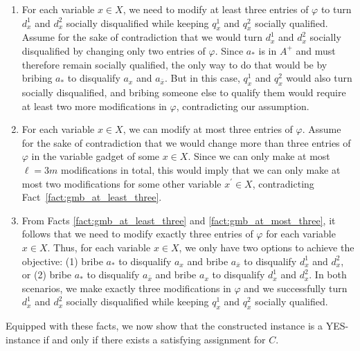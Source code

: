 \documentclass[
    12pt,               %
    a4paper,            %
    bibtotoc,           %
    pointlessnumbers,   %
    ngerman,            %
    titlepage,          %
    leqno,              %
    ]{scrarticle}       %
\newcommand\factref{Fact~\ref}
\begin{document}
\begin{Proof}
\begin{enumerate}[
    topsep=-4pt,
    leftmargin=*,
    itemindent=4.4em,
    label={\textit{Fact \ref*{thm:gmb_protective_instances_npc}.\arabic*}:},
    ref={\ref*{thm:gmb_protective_instances_npc}.\arabic*}
]
\item \label{fact:gmb_at_least_three}
For each variable $x \in X$, we need to modify at least three entries of $\varphi$ to turn $d_x^1$ and $d_x^2$ socially disqualified while keeping $q_x^1$ and $q_x^2$ socially qualified. Assume for the sake of contradiction that we would turn $d_x^1$ and $d_x^2$ socially disqualified by changing only two entries of $\varphi$. Since $a_\ast$ is in $A^+$ and must therefore remain socially qualified, the only way to do that would be by bribing $a_\ast$ to disqualify $a_x$ and $a_{\bar{x}}$. But in this case, $q_x^1$ and $q_x^2$ would also turn socially disqualified, and bribing someone else to qualify them would require at least two more modifications in $\varphi$, contradicting our assumption.

\item \label{fact:gmb_at_most_three}
For each variable $x \in X$, we can modify at most three entries of $\varphi$. Assume for the sake of contradiction that we would change more than three entries of $\varphi$ in the variable gadget of some $x \in X$. Since we can only make at most $\ell = 3m$ modifications in total, this would imply that we can only make at most two modifications for some other variable $x^\prime \in X$, contradicting \factref{fact:gmb_at_least_three}.

\item \label{fact:gmb_exactly_three}
From Facts \ref{fact:gmb_at_least_three} and \ref{fact:gmb_at_most_three}, it follows that we need to modify exactly three entries of $\varphi$ for each variable $x \in X$. Thus, for each variable $x \in X$, we only have two options to achieve the objective: (1) bribe $a_\ast$ to disqualify $a_x$ and bribe $a_{\bar{x}}$ to disqualify $d_x^1$ and $d_x^2$, or (2) bribe $a_\ast$ to disqualify $a_{\bar{x}}$ and bribe $a_x$ to disqualify $d_x^1$ and $d_x^2$. In both scenarios, we make exactly three modifications in $\varphi$ and we successfully turn $d_x^1$ and $d_x^2$ socially disqualified while keeping $q_x^1$ and $q_x^2$ socially qualified.
\end{enumerate}



Equipped with these facts, we now show that the constructed instance is a YES-instance if and only if there exists a satisfying assignment for $C$.


\end{Proof}
\end{document}
